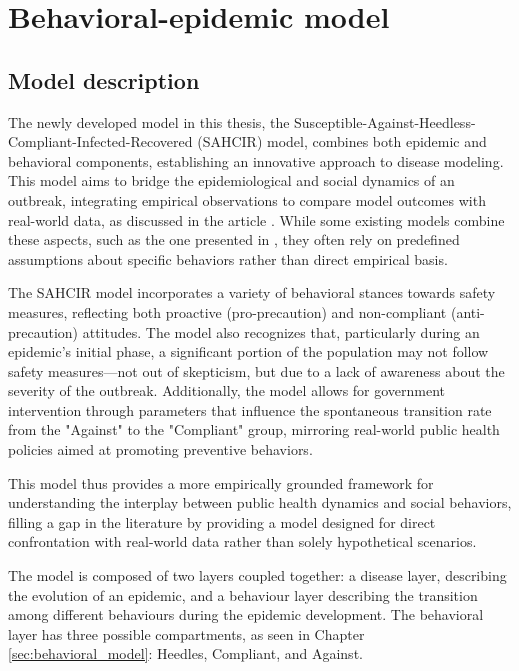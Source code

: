 \chapter{Behavioral-epidemic model}
\label{ch:epi_behav_model}
\section{Model description}

The newly developed model in this thesis, the Susceptible-Against-Heedless-Compliant-Infected-Recovered (SAHCIR) model, combines both epidemic and behavioral components, establishing an innovative approach to disease modeling. This model aims to bridge the epidemiological and social dynamics of an outbreak, integrating empirical observations to compare model outcomes with real-world data, as discussed in the article \cite{Proverbio_Tex_2024}. While some existing models combine these aspects, such as the one presented in \cite{Bulai2023}, they often rely on predefined assumptions about specific behaviors rather than direct empirical basis.

The SAHCIR  model incorporates a variety of behavioral stances towards safety measures, reflecting both proactive (pro-precaution) and non-compliant (anti-precaution) attitudes. The model also recognizes that, particularly during an epidemic's initial phase, a significant portion of the population may not follow safety measures—not out of skepticism, but due to a lack of awareness about the severity of the outbreak. Additionally, the model allows for government intervention through parameters that influence the spontaneous transition rate from the "Against" to the "Compliant" group, mirroring real-world public health policies aimed at promoting preventive behaviors. 

This model thus provides a more empirically grounded framework for understanding the interplay between public health dynamics and social behaviors, filling a gap in the literature by providing a model designed for direct confrontation with real-world data rather than solely hypothetical scenarios.


The model is composed of two layers coupled together: a disease layer, describing the evolution of an epidemic, and a behaviour layer describing the transition among different behaviours during the epidemic development.
The behavioral layer has three possible compartments, as seen in Chapter \ref{sec:behavioral_model}: Heedles, Compliant, and Against.

